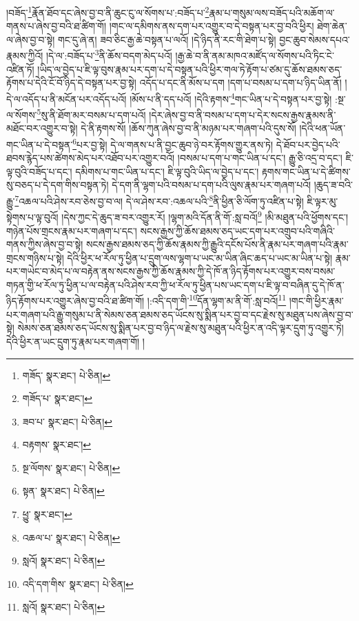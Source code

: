 །བཟོད་\footnote{གཟོད་  སྣར་ཐང་།  པེ་ཅིན། }རྣོན་ཐོབ་དང་ཞེས་བྱ་བ་ནི་ཆུང་ངུ་ལ་སོགས་པ་:བཟོད་པ་\footnote{གཟོད་པ་  སྣར་ཐང་། }རྣམ་པ་གསུམ་ལས་བཟོད་པའི་མཆོག་ལ་གནས་པ་ཞེས་བྱ་བའི་ཐ་ཚིག་གོ། །གང་ལ་དམིགས་ནས་དག་པར་འགྱུར་བ་དེ་བསྟན་པར་བྱ་བའི་ཕྱིར། ཐེག་ཆེན་ལ་ཞེས་བྱ་བ་སྟེ། གང་དུ་ཞེ་ན། ཟབ་ཅིང་རྒྱ་ཆེ་བསྟན་པ་ལའོ། །དེ་ཉིད་ནི་རང་གི་ཐེག་པ་སྟེ། བྱང་ཆུབ་སེམས་དཔའ་རྣམས་ཀྱིའོ། །དེ་ལ་:བཟོད་པ་\footnote{ཟབ་པ་  སྣར་ཐང་།  པེ་ཅིན། }ནི་ཆོས་བདག་མེད་པའོ། །རྒྱ་ཆེ་བ་ནི་ནམ་མཁའ་མཛོད་ལ་སོགས་པའི་ཏིང་ངེ་འཛིན་ཏོ། །ཡིད་ལ་བྱེད་པ་ཇི་ལྟ་བུས་རྣམ་པར་དག་པ་དེ་བསྟན་པའི་ཕྱིར་གལ་ཏེ་རྟོག་པ་ཙམ་དུ་ཆོས་ཐམས་ཅད་རྟོགས་པ་དེའི་ངོ་བོ་ཉིད་དེ་བསྟན་པར་བྱ་སྟེ། འདོད་པ་དང་ནི་མོས་པ་དག །དག་པ་བསམ་པ་དག་པ་ཉིད་ཡིན་ནོ། །དེ་ལ་འདོད་པ་ནི་མངོན་པར་འདོད་པའོ། །མོས་པ་ནི་དད་པའོ། །དེའི་རྟགས་\footnote{བརྟགས་  སྣར་ཐང་། }གང་ཡིན་པ་དེ་བསྟན་པར་བྱ་སྟེ། :སྔ་ལ་སོགས་\footnote{སྔ་ལོགས་  སྣར་ཐང་།  པེ་ཅིན། }སུ་ནི་ཐོག་མར་བསམ་པ་དག་པའོ། །དེར་ཞེས་བྱ་བ་ནི་བསམ་པ་དག་པ་དེར་སངས་རྒྱས་རྣམས་ནི་མཐོང་བར་འགྱུར་བ་སྟེ། དེ་ནི་རྟགས་སོ། །ཆོས་ཀུན་ཞེས་བྱ་བ་ནི་མཉམ་པར་གཞག་པའི་དུས་སོ། །དེའི་ཕན་ཡོན་གང་ཡིན་པ་དེ་བསྟན་\footnote{སྟན་  སྣར་ཐང་།  པེ་ཅིན། }པར་བྱ་སྟེ། དེ་ལ་གནས་པ་ནི་བྱང་ཆུབ་ཉེ་བར་རྟོགས་གྱུར་ནས་ཏེ། དེ་ཐོབ་པར་བྱེད་པའི་ཐབས་རྙེད་པས་ཚེགས་མེད་པར་འཐོབ་པར་འགྱུར་བའོ། །བསམ་པ་དག་པ་གང་ཡིན་པ་དང་། རྒྱུ་ཅི་འདྲ་བ་དང་། ཇི་ལྟ་བུའི་བཟོད་པ་དང་། དམིགས་པ་གང་ཡིན་པ་དང་། ཇི་ལྟ་བུའི་ཡིད་ལ་བྱེད་པ་དང་། རྟགས་གང་ཡིན་པ་དེ་ཚིགས་སུ་བཅད་པ་དེ་དག་གིས་བསྟན་ཏེ། དེ་དག་ནི་ལྷག་པའི་བསམ་པ་དག་པའི་ལུས་རྣམ་པར་གཞག་པའོ། །ཆུད་ཟ་བའི་རྒྱུ་\footnote{ཕྱུ་  སྣར་ཐང་། }འཆལ་པའི་ཤེས་རབ་ཅེས་བྱ་བ་ལ། དེ་ལ་ཤེས་རབ་:འཆལ་པའི་\footnote{འཆལ་པ་  སྣར་ཐང་།  པེ་ཅིན། }ནི་ཕྱིན་ཅི་ལོག་ཏུ་འཛིན་པ་སྟེ། ཇི་ལྟར་མུ་སྟེགས་པ་ལྟ་བུའོ། །དེས་ཀྱང་དེ་ཆུད་ཟ་བར་འགྱུར་རོ། །ལྷག་མའི་དོན་ནི་གོ་:སླ་བའོ།\footnote{སླའོ།  སྣར་ཐང་།  པེ་ཅིན། } །མི་མཐུན་པའི་ཕྱོགས་དང་། གཉེན་པོས་གྲངས་རྣམ་པར་གཞག་པ་དང་། སངས་རྒྱས་ཀྱི་ཆོས་ཐམས་ཅད་ཡང་དག་པར་འགྲུབ་པའི་གཞིའི་གནས་ཀྱིས་ཞེས་བྱ་བ་སྟེ། སངས་རྒྱས་ཐམས་ཅད་ཀྱི་ཆོས་རྣམས་ཀྱི་རྒྱུའི་དངོས་པོས་ནི་རྣམ་པར་གཞག་པའི་རྣམ་གྲངས་གཉིས་པ་སྟེ། དེའི་ཕྱིར་ཕ་རོལ་ཏུ་ཕྱིན་པ་དྲུག་ལས་ལྷག་པ་ཡང་མ་ཡིན་ཞིང་ཆད་པ་ཡང་མ་ཡིན་པ་སྟེ། རྣམ་པར་གཡེང་བ་མེད་པ་ལ་བརྟེན་ནས་སངས་རྒྱས་ཀྱི་ཆོས་རྣམས་ཀྱི་དེ་ཁོ་ན་ཉིད་རྟོགས་པར་འགྱུར་བས་བསམ་གཏན་གྱི་ཕ་རོལ་ཏུ་ཕྱིན་པ་ལ་བརྟེན་པའི་ཤེས་རབ་ཀྱི་ཕ་རོལ་ཏུ་ཕྱིན་པས་ཡང་དག་པ་ཇི་ལྟ་བ་བཞིན་དུ་དེ་ཁོ་ན་ཉིད་རྟོགས་པར་འགྱུར་ཞེས་བྱ་བའི་ཐ་ཚིག་གོ། །:འདི་དག་གི་\footnote{འདི་དག་གིས་  སྣར་ཐང་།  པེ་ཅིན། }དོན་ལྷག་མ་ནི་གོ་:སླ་བའོ།\footnote{སླའོ།  སྣར་ཐང་།  པེ་ཅིན། } །གང་གི་ཕྱིར་རྣམ་པར་གཞག་པའི་རྒྱུ་གསུམ་པ་ནི་སེམས་ཅན་ཐམས་ཅད་ཡོངས་སུ་སྨིན་པར་བྱ་བ་དང་རྗེས་སུ་མཐུན་པས་ཞེས་བྱ་བ་སྟེ། སེམས་ཅན་ཐམས་ཅད་ཡོངས་སུ་སྨིན་པར་བྱ་བ་ཉིད་ལ་རྗེས་སུ་མཐུན་པའི་ཕྱིར་ན་འདི་ལྟར་དྲུག་ཏུ་འགྱུར་ཏེ། དེའི་ཕྱིར་ན་ཡང་དྲུག་ཏུ་རྣམ་པར་གཞག་གོ། །
